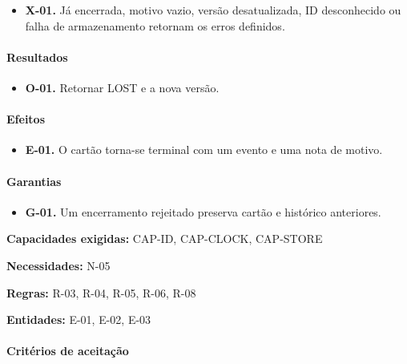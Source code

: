 \documentclass[10pt,a4paper]{article}
\begin{document}
\begin{itemize}

\item \textbf{X-01.} Já encerrada, motivo vazio, versão desatualizada, ID desconhecido ou falha de armazenamento retornam os erros definidos.

\end{itemize}

\paragraph{Resultados}

\begin{itemize}

\item \textbf{O-01.} Retornar LOST e a nova versão.

\end{itemize}

\paragraph{Efeitos}

\begin{itemize}

\item \textbf{E-01.} O cartão torna-se terminal com um evento e uma nota de motivo.

\end{itemize}

\paragraph{Garantias}

\begin{itemize}

\item \textbf{G-01.} Um encerramento rejeitado preserva cartão e histórico anteriores.

\end{itemize}

\textbf{Capacidades exigidas:} CAP-ID, CAP-CLOCK, CAP-STORE

\textbf{Necessidades:} N-05

\textbf{Regras:} R-03, R-04, R-05, R-06, R-08

\textbf{Entidades:} E-01, E-02, E-03

\paragraph{Critérios de aceitação}
\end{document}
